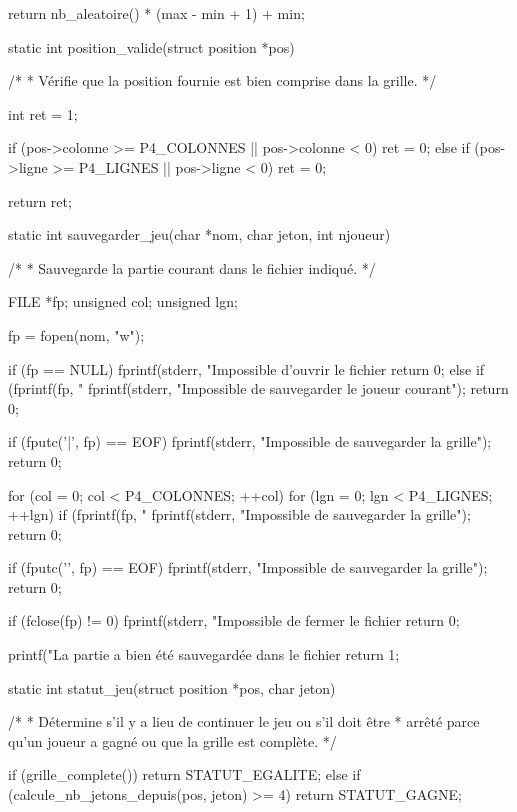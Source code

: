 \begin{C}
{    return nb_aleatoire() * (max - min + 1) + min;
}


static int position_valide(struct position *pos)
{
    /*
     * Vérifie que la position fournie est bien comprise dans la grille.
     */

    int ret = 1;

    if (pos->colonne >= P4_COLONNES || pos->colonne < 0)
        ret = 0;
    else if (pos->ligne >= P4_LIGNES || pos->ligne < 0)
        ret = 0;

    return ret;
}


static int sauvegarder_jeu(char *nom, char jeton, int njoueur)
{
    /*
     * Sauvegarde la partie courant dans le fichier indiqué.
     */

    FILE *fp;
    unsigned col;
    unsigned lgn;

    fp = fopen(nom, "w");

    if (fp == NULL)
    {
        fprintf(stderr, "Impossible d'ouvrir le fichier %
        return 0;
    }
    else if (fprintf(fp, "%
    {
        fprintf(stderr, "Impossible de sauvegarder le joueur courant\n");
        return 0;
    }

    if (fputc('|', fp) == EOF)
    {
        fprintf(stderr, "Impossible de sauvegarder la grille\n");
        return 0;
    }

    for (col = 0; col < P4_COLONNES; ++col)
    {
        for (lgn = 0; lgn < P4_LIGNES; ++lgn)
        {
            if (fprintf(fp, "%
            {
                fprintf(stderr, "Impossible de sauvegarder la grille\n");
                return 0;
            }
        }
    }

    if (fputc('\n', fp) == EOF)
    {
        fprintf(stderr, "Impossible de sauvegarder la grille\n");
        return 0;
    }

    if (fclose(fp) != 0)
    {
        fprintf(stderr, "Impossible de fermer le fichier %
        return 0;
    }
    
    printf("La partie a bien été sauvegardée dans le fichier %
    return 1;
}


static int statut_jeu(struct position *pos, char jeton)
{
    /*
     * Détermine s'il y a lieu de continuer le jeu ou s'il doit être
     * arrêté parce qu'un joueur a gagné ou que la grille est complète.
     */

    if (grille_complete())
        return STATUT_EGALITE;
    else if (calcule_nb_jetons_depuis(pos, jeton) >= 4)
        return STATUT_GAGNE;

}
\end{C}
